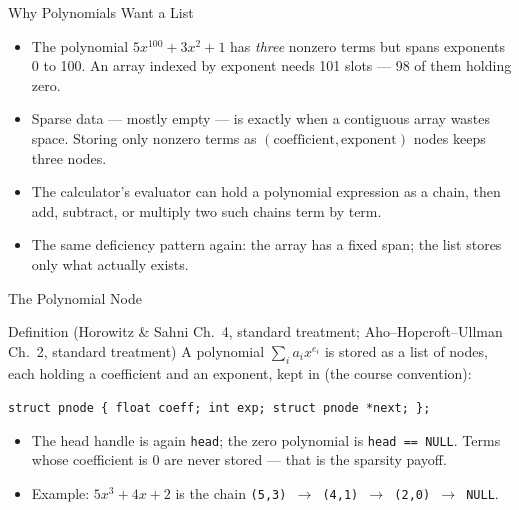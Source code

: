 \documentclass[aspectratio=169]{beamer}
\begin{document}
\begin{frame}{Why Polynomials Want a List}
  \begin{itemize}
    \item The polynomial $5x^{100} + 3x^{2} + 1$ has \emph{three} nonzero
      terms but spans exponents 0 to 100. An array indexed by exponent needs
      101 slots --- 98 of them holding zero.
    \item Sparse data --- mostly empty --- is exactly when a contiguous array
      wastes space. Storing only nonzero terms as
      $(\text{coefficient}, \text{exponent})$ nodes keeps three nodes.
    \item The calculator's evaluator can hold a polynomial expression as a
      chain, then add, subtract, or multiply two such chains term by term.
    \item The same deficiency pattern again: the array has a fixed span; the
      list stores only what actually exists.
  \end{itemize}
\end{frame}

\begin{frame}{The Polynomial Node}
  \begin{block}{Definition (Horowitz \& Sahni Ch.~4, standard treatment;
    Aho--Hopcroft--Ullman Ch.~2, standard treatment)
    \cite{HorowitzSahni2008_fundamentals_data_structures,AhoHopcroftUllman1983_data_structures_algorithms}}
    A polynomial $\sum_i a_i x^{e_i}$ is stored as a list of nodes, each
    holding a coefficient and an exponent, kept in  (the course convention):
  \end{block}
\begin{center}
{\small \texttt{struct pnode \{ float coeff; int exp; struct pnode *next;
  \};}}
\end{center}
  \begin{itemize}
    \item The head handle is again \texttt{head}; the zero polynomial is
      \texttt{head == NULL}. Terms whose coefficient is $0$ are never stored
      --- that is the sparsity payoff.
    \item Example: $5x^{3} + 4x + 2$ is the chain
      \texttt{(5,3) $\to$ (4,1) $\to$ (2,0) $\to$ NULL}.
  \end{itemize}
\end{frame}
\end{document}
